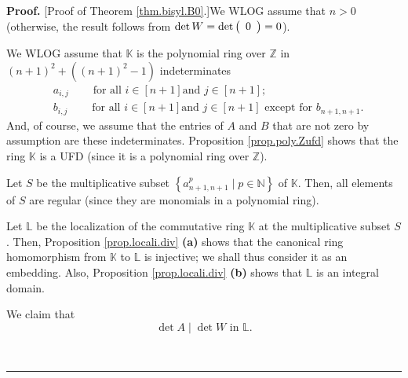 \documentclass[numbers=enddot,12pt,final,onecolumn,notitlepage]{scrartcl}%
\theoremstyle{definition}
\newenvironment{proof}[1][Proof]{\noindent\textbf{#1.} }{\ \rule{0.5em}{0.5em}}
\begin{document}
\begin{proof}
[Proof of Theorem \ref{thm.bisyl.B0}.]We WLOG assume that $n>0$ (otherwise,
the result follows from $\det W=\det\left(
\begin{array}
[c]{c}%
0
\end{array}
\right)  =0$).

We WLOG assume that $\mathbb{K}$ is the polynomial ring over $\mathbb{Z}$ in
$\left(  n+1\right)  ^{2}+\left(  \left(  n+1\right)  ^{2}-1\right)  $
indeterminates%
\begin{align*}
&  a_{i,j}\ \ \ \ \ \ \ \ \ \ \text{for all }i\in\left[  n+1\right]  \text{
and }j\in\left[  n+1\right]  ;\\
&  b_{i,j}\ \ \ \ \ \ \ \ \ \ \text{for all }i\in\left[  n+1\right]  \text{
and }j\in\left[  n+1\right]  \text{ except for }b_{n+1,n+1}.
\end{align*}
And, of course, we assume that the entries of $A$ and $B$ that are not zero by
assumption are these indeterminates. Proposition \ref{prop.poly.Zufd} shows
that the ring $\mathbb{K}$ is a UFD (since it is a polynomial ring over
$\mathbb{Z}$).

Let $S$ be the multiplicative subset $\left\{  a_{n+1,n+1}^{p}\mid
p\in\mathbb{N}\right\}  $ of $\mathbb{K}$. Then, all elements of $S$ are
regular (since they are monomials in a polynomial ring).

Let $\mathbb{L}$ be the localization of the commutative ring $\mathbb{K}$ at
the multiplicative subset $S$. Then, Proposition \ref{prop.locali.div}
\textbf{(a)} shows that the canonical ring homomorphism from $\mathbb{K}$ to
$\mathbb{L}$ is injective; we shall thus consider it as an embedding. Also,
Proposition \ref{prop.locali.div} \textbf{(b)} shows that $\mathbb{L}$ is an
integral domain.

We claim that%
\begin{equation}
\det A\mid\det W\text{ in }\mathbb{L}. \label{pf.thm.bisyl.B0.inL}%
\end{equation}



\end{proof}
\end{document}
